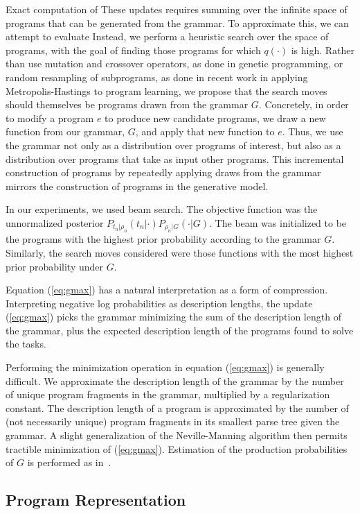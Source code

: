 \documentclass{article} %
\begin{document}
Exact computation of These updates requires summing over the infinite space of programs that can be generated from the grammar. To approximate this, we can attempt to evaluate 
Instead, we perform a heuristic search over the space of programs, with the goal of finding those programs for which $q(\cdot)$ is high.
Rather than use mutation and crossover operators, as done in genetic programming, or random resampling of subprograms, as done in recent work in applying Metropolis-Hastings to program learning, we propose that the search moves should themselves be programs drawn from the grammar $G$.
Concretely, in order to modify a program $e$ to produce new candidate programs, we draw a new function from our grammar, $G$, and apply that new function to $e$.
Thus, we use the grammar not only as a distribution over programs of interest, but also as a distribution over programs that take as input other programs.
This incremental construction of programs by repeatedly applying draws from the grammar mirrors the construction of programs in the generative model.

In our experiments, we used beam search. The objective function was the unnormalized posterior $P_{t_n|\rho_n}(t_n | \cdot )P_{\rho_n | G}(\cdot | G)$.
The beam was initialized to be the programs with the highest prior probability according to the grammar $G$.
Similarly, the search moves considered were those functions with the most highest prior probability under $G$.

Equation (\ref{eq:gmax}) has a natural interpretation as a form of compression.
Interpreting negative log probabilities as description lengths, the update (\ref{eq:gmax}) picks the grammar minimizing the sum of the description length of the grammar, plus the expected description length of the programs found to solve the tasks.

Performing the minimization operation in equation (\ref{eq:gmax}) is generally difficult.
We approximate the description length of the grammar by the number of unique program fragments in the grammar, multiplied by a regularization constant.
The description length of a program is approximated by the number of (not necessarily unique) program fragments in its smallest parse tree given the grammar.
A slight generalization of the Neville-Manning algorithm then permits tractible minimization of (\ref{eq:gmax}).
Estimation of the production probabilities of $G$ is performed as in~\citet{DBLP:conf/ijcai/DechterMAT13}.

\subsection{Program Representation}
\end{document}
